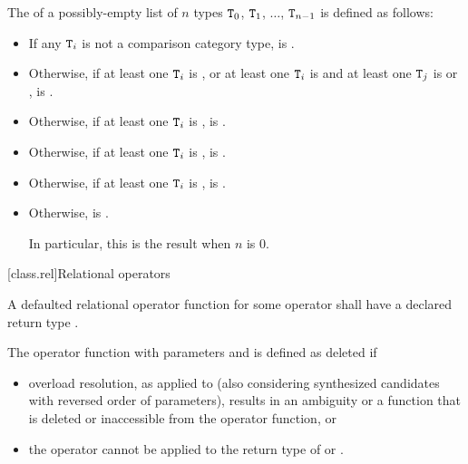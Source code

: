 \pnum
The  
of a possibly-empty list of $n$ types
$\texttt{T}_0$, $\texttt{T}_1$, $\dotsc$, $\texttt{T}_{n-1}$
is defined as follows:

\begin{itemize}
\item
If any $\texttt{T}_i$
is not a comparison category type,
 is .

\item
Otherwise, if
at least one $\texttt{T}_i$ is , or
at least one $\texttt{T}_i$ is  and
at least one $\texttt{T}_j$ is  or
                              ,
 is .

\item
Otherwise, if at least one $\texttt{T}_i$ is ,
 is .

\item
Otherwise, if at least one $\texttt{T}_i$ is ,
 is .

\item
Otherwise, if at least one $\texttt{T}_i$ is ,
 is .

\item
Otherwise,  is .
\begin{note}
In particular, this is the result when $n$ is 0.
\end{note}
\end{itemize}

[class.rel]{Relational operators}
%

\pnum
A defaulted relational operator function
for some operator 
shall have a declared return type .

\pnum
The operator function with parameters  and 
is defined as deleted if

\begin{itemize}
\item
overload resolution,
as applied to 
(also considering synthesized candidates with reversed order of parameters),
results in an ambiguity
or a function that is deleted or inaccessible from the operator function,
or

\item
the operator 
cannot be applied to the return type of  or .
\end{itemize}

